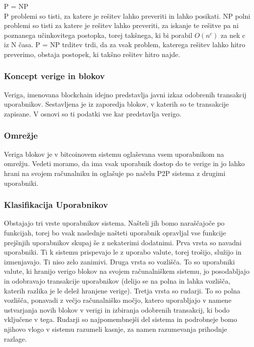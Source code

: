 \documentclass[letterpaper, titlepage, freqn]{article}
\begin{document}
 
P = NP\\
P problemi so tisti, za katere je rešitev lahko preveriti in lahko posikati. NP polni problemi so tisti za katere je rešitev lahko preveriti, za iskanje te rešitve pa ni poznanega učinkovitega postopka, torej takšnega, ki bi porabil $O(n^{c})$ za nek c iz N časa. P = NP trditev trdi, da za vsak problem, katerega rešitev lahko hitro preverimo, obstaja postopek, ki takšno rešitev hitro najde.\\
 
\subsubsection{Koncept verige in blokov}

Veriga, imenovana blockchain idejno predstavlja javni izkaz odobrenih transakcij uporabnikov. Sestavljena je iz zaporedja blokov, v katerih so te transakcije zapisane. V osnovi so ti podatki vse kar predstavlja verigo.\\
 
\subsubsection{Omrežje}

Veriga blokov je v bitcoinovem sistemu oglaševana vsem uporabnikom na omrežju. Vedeti moramo, da ima vsak uporabnik dostop do te verige in jo lahko hrani na svojem računalniku in oglašuje po načelu P2P sistema z drugimi uporabniki.\\
 
\subsubsection{Klasifikacija Uporabnikov}

Obstajajo tri vrste uporabnikov sistema. Našteli jih bomo naraščajoče po funkcijah, torej bo vsak naslednje našteti uporabnik opravljal vse funkcije prejšnjih uporabnikov skupaj še z nekaterimi dodatnimi.
Prva vrsta so navadni uporabniki. Ti k sistemu prispevajo le z uporabo valute, torej trošijo, služijo in izmenjavajo. Ti niso zelo zanimivi.
Druga vrsta so vozlišča. To so uporabniki valute, ki hranijo verigo blokov na svojem računalniškem sistemu, jo posodabljajo in odobravajo transakcije uporabnikov (delijo se na polna in lahka vozlišča, katerih razlika je le delež hranjene verige).
Tretja vrsta so rudarji. To so polna vozlišča, ponavadi z večjo računalniško močjo, katero uporabljajo v namene ustvarjanja novih blokov v verigi in izbiranja odobrenih transakcij, ki bodo vključene v tega. Rudarji so najpomembnejši del sistema in podrobneje bomo njihovo vlogo v sistemu razumeli kasnje, za namen razumevanja prihodnje razlage.\\
 
\end{document}
